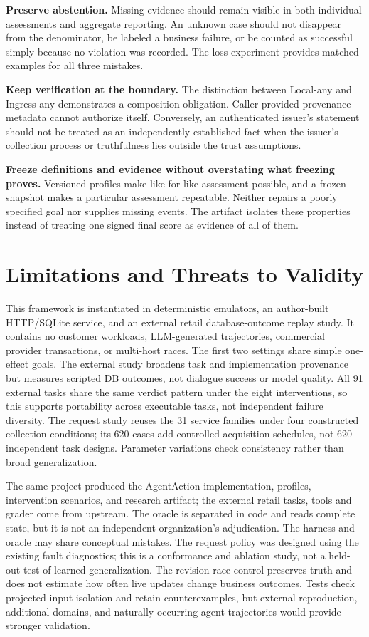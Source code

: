 \documentclass[11pt]{article}
\begin{document}
\textbf{Preserve abstention.} Missing evidence should remain visible in both individual assessments and aggregate reporting. An unknown case should not disappear from the denominator, be labeled a business failure, or be counted as successful simply because no violation was recorded. The loss experiment provides matched examples for all three mistakes.

\textbf{Keep verification at the boundary.} The distinction between Local-any and Ingress-any demonstrates a composition obligation. Caller-provided provenance metadata cannot authorize itself. Conversely, an authenticated issuer's statement should not be treated as an independently established fact when the issuer's collection process or truthfulness lies outside the trust assumptions.

\textbf{Freeze definitions and evidence without overstating what freezing proves.} Versioned profiles make like-for-like assessment possible, and a frozen snapshot makes a particular assessment repeatable. Neither repairs a poorly specified goal nor supplies missing events. The artifact isolates these properties instead of treating one signed final score as evidence of all of them.

\section{Limitations and Threats to Validity}
This framework is instantiated in deterministic emulators, an author-built HTTP/SQLite service, and an external retail database-outcome replay study. It contains no customer workloads, LLM-generated trajectories, commercial provider transactions, or multi-host races. The first two settings share simple one-effect goals. The external study broadens task and implementation provenance but measures scripted DB outcomes, not dialogue success or model quality. All 91 external tasks share the same verdict pattern under the eight interventions, so this supports portability across executable tasks, not independent failure diversity. The request study reuses the 31 service families under four constructed collection conditions; its 620 cases add controlled acquisition schedules, not 620 independent task designs. Parameter variations check consistency rather than broad generalization.

The same project produced the AgentAction implementation, profiles, intervention scenarios, and research artifact; the external retail tasks, tools and grader come from upstream. The oracle is separated in code and reads complete state, but it is not an independent organization's adjudication. The harness and oracle may share conceptual mistakes. The request policy was designed using the existing fault diagnostics; this is a conformance and ablation study, not a held-out test of learned generalization. The revision-race control preserves truth and does not estimate how often live updates change business outcomes. Tests check projected input isolation and retain counterexamples, but external reproduction, additional domains, and naturally occurring agent trajectories would provide stronger validation.
\end{document}
